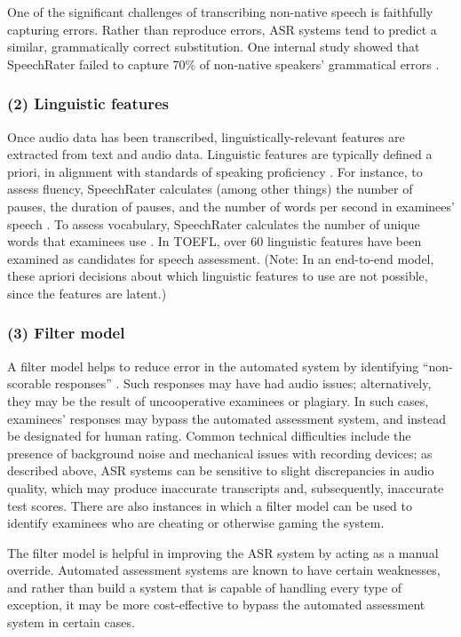 \documentclass [PhD] {uclathes}
\begin{document}
One of the significant challenges of transcribing non-native speech is faithfully capturing errors. Rather than reproduce errors, ASR systems tend to predict a similar, grammatically correct substitution. One internal study showed that SpeechRater failed to capture 70\% of non-native speakers’ grammatical errors \citep{yoon2019features}.

\subsubsection{(2) Linguistic features}

Once audio data has been transcribed, linguistically-relevant features are extracted from text and audio data. Linguistic features are typically defined a priori, in alignment with standards of speaking proficiency \citep[e.g.][]{brown2005examination}. For instance, to assess fluency, SpeechRater calculates (among other things) the number of pauses, the duration of pauses, and the number of words per second in examinees’ speech \citep{hsieh2019features}. To assess vocabulary, SpeechRater calculates the number of unique words that examinees use \citep{yoon2019features}. In TOEFL, over 60 linguistic features have been examined as candidates for speech assessment. (Note: In an end-to-end model, these apriori decisions about which linguistic features to use are not possible, since the features are latent.)

\subsubsection{(3) Filter model}

A filter model helps to reduce error in the automated system by identifying “non-scorable responses” \citep{loukina2019scoring}. Such responses may have had audio issues; alternatively, they may be the result of uncooperative examinees or plagiary. In such cases, examinees’ responses may bypass the automated assessment system, and instead be designated for human rating. Common technical difficulties include the presence of background noise and mechanical issues with recording devices; as described above, ASR systems can be sensitive to slight discrepancies in audio quality, which may produce inaccurate transcripts and, subsequently, inaccurate test scores. There are also instances in which a filter model can be used to identify examinees who are cheating or otherwise gaming the system.

The filter model is helpful in improving the ASR system by acting as a manual override. Automated assessment systems are known to have certain weaknesses, and rather than build a system that is capable of handling every type of exception, it may be more cost-effective to bypass the automated assessment system in certain cases.
\end{document}
